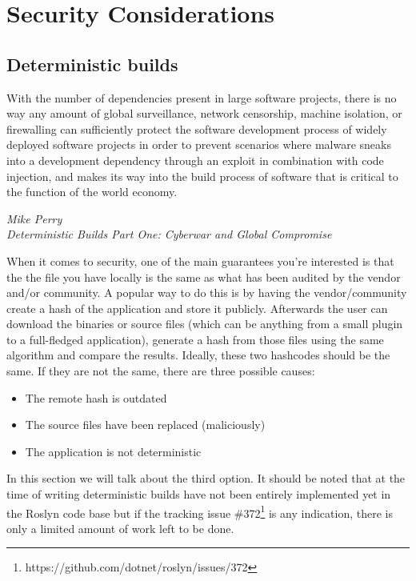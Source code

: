 \section{Security Considerations}
\label{sec:security}

\subsection{Deterministic builds}
\label{sec:deterministic-builds}

\epigraph{With the number of dependencies present in large software projects, there is no way any amount of global surveillance, network censorship, machine isolation, or firewalling can sufficiently protect the software development process of widely deployed software projects in order to prevent scenarios where malware sneaks into a development dependency through an exploit in combination with code injection, and makes its way into the build process of software that is critical to the function of the world economy.}
{\textit{Mike Perry \\ \footnotesize{Deterministic Builds Part One: Cyberwar and Global Compromise\protect\footnotemark}}}


When it comes to security, one of the main guarantees you're interested is that the the file you have locally is the same as what has been audited by the vendor and/or community. A popular way to do this is by having the vendor/community create a hash of the application and store it publicly. Afterwards the user can download the binaries or source files (which can be anything from a small plugin to a full-fledged application), generate a hash from those files using the same algorithm and compare the results. Ideally, these two hashcodes should be the same. If they are not the same, there are three possible causes:

\begin{itemize}
\item The remote hash is outdated
\item The source files have been replaced (maliciously)
\item The application is not deterministic
\end{itemize}

In this section we will talk about the third option. It should be noted that at the time of writing deterministic builds have not been entirely implemented yet in the Roslyn code base but if the tracking issue \#372\footnote{https://github.com/dotnet/roslyn/issues/372} is any indication, there is only a limited amount of work left to be done.

